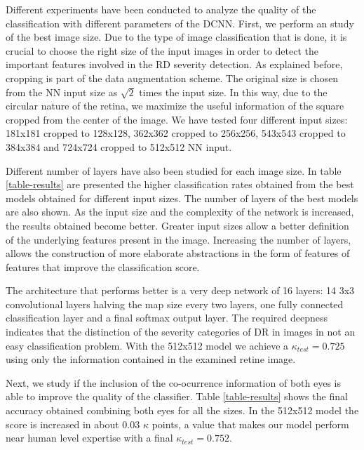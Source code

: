 \documentclass{IOS-Book-Article}
\begin{document}
Different experiments have been conducted to analyze the quality of the classification with different parameters of the DCNN. First, we perform an study of the best image size. Due to the type of image classification that is done, it is crucial to choose the right size of the input images in order to detect the important features involved in the RD severity detection. As explained before, cropping is part of the data augmentation scheme. The original size is chosen from the NN input size as $\sqrt{2}$ times the input size. In this way, due to the circular nature of the retina, we maximize the useful information of the square cropped from the center of the image. We have tested four different input sizes: 181x181 cropped to 128x128, 362x362 cropped to 256x256, 543x543 cropped to 384x384 and 724x724 cropped to 512x512 NN input. 

Different number of layers have also been studied for each image size. In table \ref{table-results} are presented the higher classification rates obtained from the best models obtained for different input sizes. The number of layers of the best models are also shown. As the input size and the complexity of the network is increased, the results obtained become better. Greater input sizes allow a better definition of the underlying features present in the image. Increasing the number of layers, allows the construction of more elaborate abstractions in the form of features of features that improve the classification score. 

The architecture that performs better is a very deep network of 16 layers: 14 3x3 convolutional layers halving the map size every two layers, one fully connected classification layer and a final softmax output layer. The required deepness indicates that the distinction of the severity categories of DR in images in not an easy classification problem. With the 512x512 model we achieve a $\kappa_{test} = 0.725$ using only the information contained in the examined retine image.

Next, we study if the inclusion of the co-ocurrence information of both eyes is able to improve the quality of the classifier. Table \ref{table-results} shows the final accuracy obtained combining both eyes for all the sizes. In the 512x512 model the score is increased in about $0.03$ $\kappa$ points, a value that makes our model perform near human level expertise with a final $\kappa_{test} = 0.752$.
\end{document}
